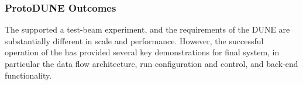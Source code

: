 
\subsubsection{ProtoDUNE Outcomes}

The   supported a test-beam experiment, and the requirements of the DUNE  are substantially different in scale and performance.
However, the successful operation of the   has provided several key demonstrations for final system, in particular the data flow architecture, run configuration and control, and back-end functionality.

